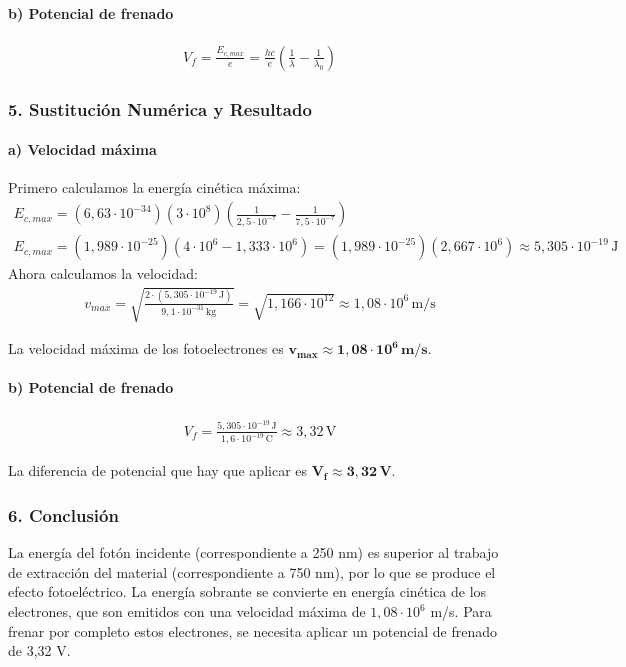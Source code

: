 \paragraph{b) Potencial de frenado}
\begin{gather}
    V_f = \frac{E_{c,max}}{e} = \frac{hc}{e}\left(\frac{1}{\lambda} - \frac{1}{\lambda_0}\right)
\end{gather}

\subsubsection*{5. Sustitución Numérica y Resultado}
\paragraph{a) Velocidad máxima}
Primero calculamos la energía cinética máxima:
\begin{gather}
    E_{c,max} = (6,63\cdot10^{-34})(3\cdot10^8)\left(\frac{1}{2,5\cdot10^{-7}} - \frac{1}{7,5\cdot10^{-7}}\right) \\
    E_{c,max} = (1,989\cdot10^{-25})\left(4\cdot10^6 - 1,333\cdot10^6\right) = (1,989\cdot10^{-25})(2,667\cdot10^6) \approx 5,305\cdot10^{-19}\,\text{J}
\end{gather}
Ahora calculamos la velocidad:
\begin{gather}
    v_{max} = \sqrt{\frac{2 \cdot (5,305\cdot10^{-19}\,\text{J})}{9,1\cdot10^{-31}\,\text{kg}}} = \sqrt{1,166\cdot10^{12}} \approx 1,08 \cdot 10^6\,\text{m/s}
\end{gather}
\begin{cajaresultado}
La velocidad máxima de los fotoelectrones es $\boldsymbol{v_{max} \approx 1,08 \cdot 10^6\,\textbf{m/s}}$.
\end{cajaresultado}
\paragraph{b) Potencial de frenado}
\begin{gather}
    V_f = \frac{5,305\cdot10^{-19}\,\text{J}}{1,6\cdot10^{-19}\,\text{C}} \approx 3,32\,\text{V}
\end{gather}
\begin{cajaresultado}
La diferencia de potencial que hay que aplicar es $\boldsymbol{V_f \approx 3,32\,\textbf{V}}$.
\end{cajaresultado}

\subsubsection*{6. Conclusión}
\begin{cajaconclusion}
La energía del fotón incidente (correspondiente a 250 nm) es superior al trabajo de extracción del material (correspondiente a 750 nm), por lo que se produce el efecto fotoeléctrico. La energía sobrante se convierte en energía cinética de los electrones, que son emitidos con una velocidad máxima de $1,08 \cdot 10^6$ m/s. Para frenar por completo estos electrones, se necesita aplicar un potencial de frenado de 3,32 V.
\end{cajaconclusion}
\newpage

